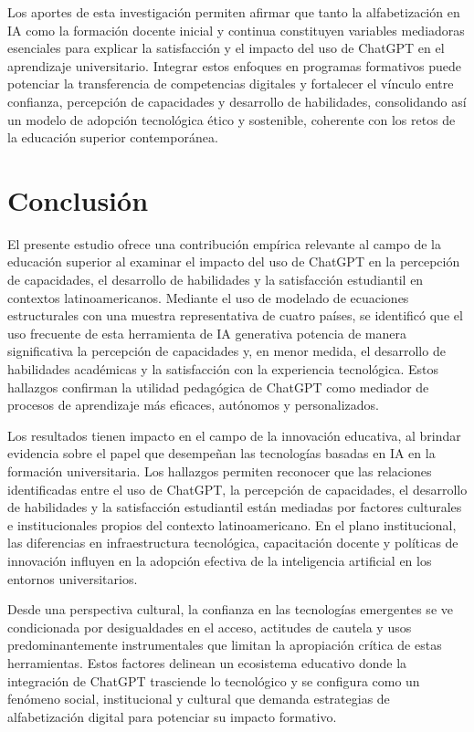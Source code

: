 \documentclass[spanish]{textolivre}
\begin{document}
Los aportes de esta investigación permiten afirmar que tanto la alfabetización en IA como la formación docente inicial y continua constituyen variables mediadoras esenciales para explicar la satisfacción y el impacto del uso de ChatGPT en el
aprendizaje universitario. Integrar estos enfoques en programas formativos puede potenciar la transferencia de competencias digitales y fortalecer el vínculo entre confianza, percepción de capacidades y desarrollo de habilidades, consolidando así un modelo de adopción tecnológica ético y sostenible, coherente con los retos de la educación superior contemporánea.

\section{Conclusión}
El presente estudio ofrece una contribución empírica relevante al campo de la educación superior al examinar el impacto del uso de ChatGPT en la percepción de capacidades, el desarrollo de habilidades y la satisfacción estudiantil en contextos latinoamericanos. Mediante el uso de modelado de ecuaciones estructurales con una muestra representativa de cuatro países, se identificó que el uso frecuente de esta herramienta de IA generativa potencia de manera significativa la percepción de capacidades y, en menor medida, el desarrollo de habilidades académicas y la satisfacción con la experiencia tecnológica. Estos hallazgos confirman la utilidad pedagógica de ChatGPT como mediador de procesos de aprendizaje más eficaces, autónomos y personalizados.

Los resultados tienen impacto en el campo de la innovación educativa, al brindar evidencia sobre el papel que desempeñan las tecnologías basadas en IA en la formación universitaria. Los hallazgos permiten reconocer que las relaciones identificadas entre el uso de ChatGPT, la percepción de capacidades, el desarrollo de habilidades y la satisfacción estudiantil están mediadas por factores culturales e institucionales propios del contexto latinoamericano. En el plano institucional, las diferencias en infraestructura tecnológica, capacitación docente y políticas de innovación influyen en la adopción efectiva de la inteligencia artificial en los entornos universitarios. 

Desde una perspectiva cultural, la confianza en las tecnologías emergentes se ve condicionada por desigualdades en el acceso, actitudes de cautela y usos predominantemente instrumentales que limitan la apropiación crítica de estas herramientas. Estos factores delinean un ecosistema educativo donde la integración de ChatGPT trasciende lo tecnológico y se configura como un fenómeno social, institucional y cultural que demanda estrategias de alfabetización digital para potenciar su impacto formativo.
\end{document}
